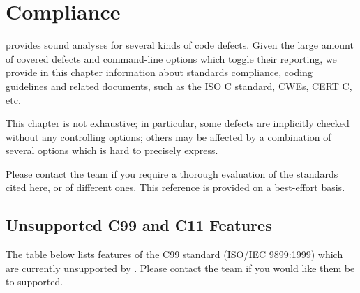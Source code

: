 
\chapter{Compliance}
\label{user-compliance}

\newcommand{\CWE}[1]{\href{https://cwe.mitre.org/data/definitions/#1.html}{CWE-#1}}

\let\oldlongtable\longtable
\let\endoldlongtable\endlongtable
\renewenvironment{longtable}{\rowcolors{2}{white}{lightgray}\oldlongtable} {
\endoldlongtable}

\FramaC provides sound analyses for several kinds of code defects.
Given the large amount of covered defects and command-line options which
toggle their reporting, we provide in this chapter information about standards
compliance, coding guidelines and related documents, such as the ISO C standard,
CWEs, CERT C, etc.

This chapter is not exhaustive; in particular, some defects are implicitly
checked without any controlling options; others may be affected by
a combination of several options which is hard to precisely express.

Please contact the \FramaC team if you require a thorough evaluation of the
standards cited here, or of different ones. This reference is provided on a
best-effort basis.

\section{Unsupported C99 and C11 Features}
\label{sec:unsupported-iso-c-features}

The table below lists features of the C99 standard (ISO/IEC 9899:1999) which
are currently unsupported by \FramaC. Please contact the \FramaC team if you
would like them be to supported.

